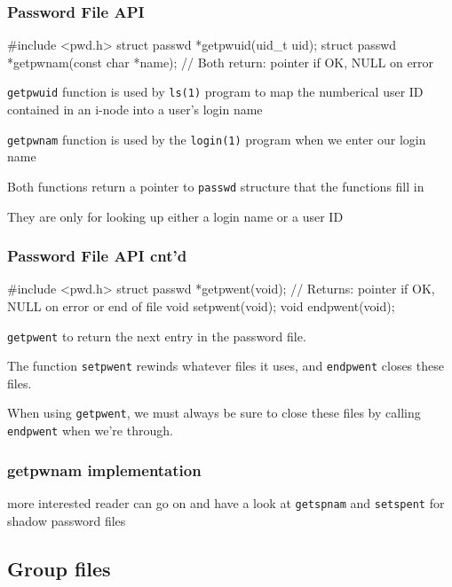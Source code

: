 \documentclass[newPxFont,sthlmFooter,nooffset]{beamer}
\begin{document}
\begin{frame}[containsverbatim,t]
  \frametitle{Password File API }
\begin{codedef}
#include <pwd.h>
struct passwd *getpwuid(uid_t uid);
struct passwd *getpwnam(const char *name);
// Both return: pointer if OK, NULL on error
\end{codedef}

\texttt{getpwuid} function is used by \texttt{ls(1)} program to map the numberical user ID contained in an i-node into a user's login name

\texttt{getpwnam} function is used by the \texttt{login(1)} program when we enter our login name

Both functions return a pointer to \texttt{passwd} structure that the functions fill in

They are only for looking up either a login name or a user ID
\end{frame}



\begin{frame}[containsverbatim,t]
  \frametitle{Password File API cnt'd}

\begin{codedef}
#include <pwd.h>
struct passwd *getpwent(void);
// Returns: pointer if OK, NULL on error or end of file
void setpwent(void);
void endpwent(void);
\end{codedef}

\texttt{getpwent} to return the next entry in the password file.

The function \texttt{setpwent} rewinds whatever files it uses, and \texttt{endpwent} closes these files.

 When using \texttt{getpwent}, we must always be sure to close these files by calling \texttt{endpwent} when we’re through.
\end{frame}


\begin{frame}[containsverbatim,t]
  \frametitle{getpwnam implementation}


more interested reader can go on and have a look at \texttt{getspnam} and \texttt{setspent} for shadow password files
\end{frame}


\subsection{Group files}
\end{document}
